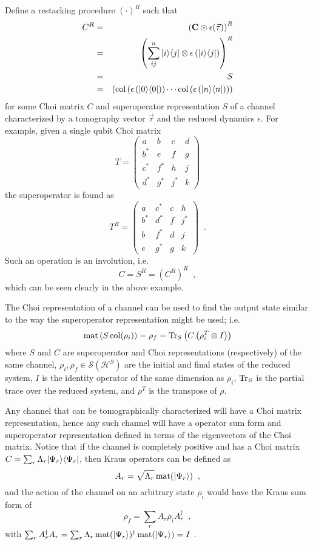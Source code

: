 Define a restacking procedure $(\cdot)^R$ such that
\begin{eqnarray*}
C^R &=& \left(\mathbf{C}\odot\epsilon(\vec{\tau})\right)^R \\
&=& \left(\sum_{ij}^n |i\rangle\langle j| \otimes \epsilon\left( |i\rangle\langle j| \right)\right)^R\\
&=& S \\
&=& \left(\operatorname{col}\left( \epsilon\left( |0\rangle\langle0| \right)\right) \cdots \operatorname{col}\left( \epsilon\left( |n\rangle\langle n| \right)\right) \right)
\end{eqnarray*}
for some Choi matrix $C$ and superoperator representation $S$ of a channel characterized by a tomography vector $\vec{\tau}$ and the reduced dynamics $\epsilon$.  For example, given a single qubit Choi matrix
$$
T = \begin{pmatrix}
a  &b  &c  &d\\
b^*&e  &f  &g\\
c^*&f^*&h  &j\\
d^*&g^*&j^*&k
\end{pmatrix}   
$$
the superoperator is found as
$$
T^R = \begin{pmatrix}
a  &c^*&c  &h\\
b^*&d^*&f  &j^*\\
b  &f^*&d  &j\\
e  &g^*&g  &k
\end{pmatrix}\;\;.
$$
Such an operation is an involution, i.e.\
$$
C = S^R = (C^R)^R\;\;,
$$
which can be seen clearly in the above example.

The Choi representation of a channel can be used to find the output state similar to the way the superoperator representation might be used; i.e. \cite{Paris2004}\
$$
\operatorname{mat}\left(S\operatorname{col}(\rho_i)\right) = \rho_f = \operatorname{Tr}_S\left(C\left(\rho_i^T\otimes I\right)\right)
$$
where $S$ and $C$ are superoperator and Choi representations (respectively) of the same channel, $\rho_i,\rho_f\in\mathcal{S}(\mathcal{H}^S)$ are the initial and final states of the reduced system, $I$ is the identity operator of the same dimension as $\rho_{i}$, $\operatorname{Tr}_S$ is the partial trace over the reduced system, and $\rho^T$ is the transpose of $\rho$.  

Any channel that can be tomographically characterized will have a Choi matrix representation, hence any such channel will have a operator sum form and superoperator representation defined in terms of the eigenvectors of the Choi matrix.  Notice that if the channel is completely positive and has a Choi matrix $C=\sum_r \Lambda_r |\Psi_r\rangle\langle\Psi_r|$, then Kraus operators can be defined as
$$
A_r = \sqrt{\Lambda_r} \operatorname{mat}(\left|\Psi_r\right\rangle)\;\;,
$$
and the action of the channel on an arbitrary state $\rho_i$ would have the Kraus sum form of
$$
\rho_f = \sum_r A_r \rho_i A_r^\dagger\;\;,
$$
with $\sum_r A_r^\dagger A_r = \sum_r \Lambda_r \operatorname{mat}(\left|\Psi_r\right\rangle)^\dagger \operatorname{mat}(\left|\Psi_r\right\rangle) = I$ \cite{Havel2003}.

